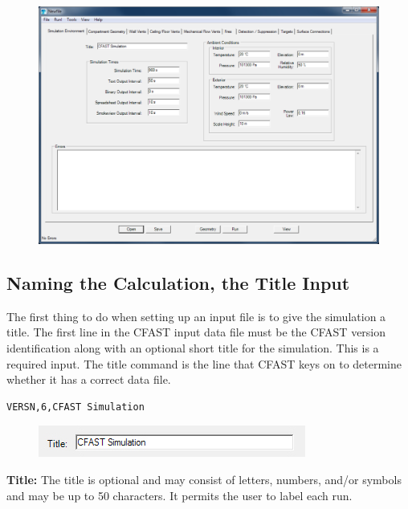 \begin{figure}[h!]
\begin{center}
\includegraphics[width=6.5in]{FIGURES/Input_File/Environment_Tab}
\end{center}
\end{figure}

\subsection{Naming the Calculation, the Title Input}

The first thing to do when setting up an input file is to give the simulation a title.  The first line in the CFAST input data file must be the CFAST version identification along with an optional short title for the simulation.  This is a required input.  The title command is the line that CFAST keys on to determine whether it has a correct data file.

\begin{lstlisting}
VERSN,6,CFAST Simulation
\end{lstlisting}

\clearpage

\begin{figure}[h!]
\begin{center}
\includegraphics[width=3.458in]{FIGURES/Input_File/Title}
\end{center}
\end{figure}

\textbf{Title:} The title is optional and may consist of letters, numbers, and/or symbols and may be up to 50 characters. It permits the user to label each run.


